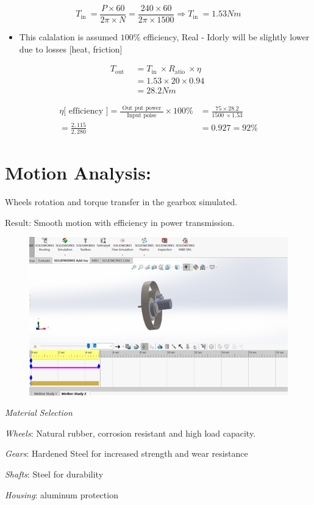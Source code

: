\documentclass[../../main]{subfiles}
\begin{document}
\[T_{\text{in~}} = \frac{P \times 60}{2\pi \times N} = \frac{240 \times 60}{2\pi \times 1500} \Rightarrow T_{\text{in~}} = 1.53Nm\]

\begin{itemize}
\item
  This calalation is assumed \(100\%\) efficiency, Real - Idorly will be
  slightly lower due to losses {[}heat, friction{]}
\end{itemize}

\[\begin{aligned}
T_{\text{out~}}  \  &= T_{\text{in~}} \times R_{\text{atio~}} \times \eta\text{~~} \\
\  &= 1.53 \times 20 \times 0.94 \\
\  &= 28.2Nm
\end{aligned}\]

\[\begin{aligned}
\eta\lbrack\text{~efficiency~}\rbrack = \frac{\text{~Out put power~}}{\text{~Input poise~}} \times 100\% &= \frac{75 \times 28.2}{1500\  \times 1.53} \\
= \frac{2,115}{2,280} &= 0.927 = 92\%
\end{aligned}\]


\section{Motion Analysis:}

Wheels\textquotesingle{} rotation and torque transfer in the gearbox
simulated.

Result: Smooth motion with efficiency in power transmission.
\begin{figure}[h]
  \centering
\includegraphics[]{sublatex/Opryrmi/media/image7.png}
\caption{}
\end{figure}

\emph{Material Selection}

\emph{Wheels}: Natural rubber, corrosion resistant and high load capacity.

\emph{Gears}: Hardened Steel for increased strength and wear resistance

\emph{Shafts}: Steel for durability

\emph{Housing}: aluminum protection
\end{document}
